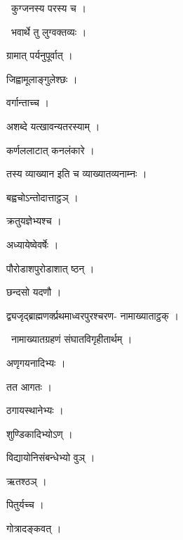 \documentclass[10pt, openany, oneside]{book}
\begin{document}
\par\noindent\hspace{1.5em}{\vps वा॰}~{\qt कुग्जनस्य परस्य च ।}

\par\noindent\hspace{1.5em}{\vps वा॰}~{\qt भवार्थे तु लुग्वक्तव्यः ।}

\noindent ग्रामात् पर्यनुपूर्वात् ।

\noindent जिह्वामूलाङ्गुलेश्छः ।

\noindent वर्गान्ताच्च ।

\noindent अशब्दे यत्खावन्यतरस्याम् ।

\noindent कर्णललाटात् कनलंकारे ।

\noindent तस्य व्याख्यान इति च व्याख्यातव्यनाम्नः ।

\noindent बह्वचोऽन्तोदात्ताट्ठञ् ।

\noindent क्रतुयज्ञेभ्यश्च ।

\noindent अध्यायेष्वेवर्षेः ।

\noindent पौरोडाशपुरोडाशात् ष्ठन् ।

\noindent छन्दसो यदणौ ।

\noindent द्व्यजृद्ब्राह्मणर्क्प्रथमाध्वरपुरश्चरण- नामाख्याताट्ठक् ।

\par\noindent\hspace{1.5em}{\vps वा॰}~{\qt नामाख्यातग्रहणं संघातविगृहीतार्थम् ।}

\noindent अणृगयनादिभ्यः ।

\noindent तत आगतः ।

\noindent ठगायस्थानेभ्यः ।

\noindent शुण्डिकादिभ्योऽण् ।

\noindent विद्यायोनिसंबन्धेभ्यो वुञ् ।

\noindent ऋतश्ठञ् ।

\noindent पितुर्यच्च ।

\noindent गोत्रादङ्कवत् ।
\end{document}
